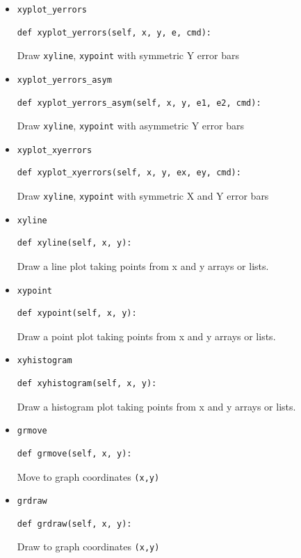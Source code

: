\documentclass[a4paper,twoside,11pt]{article}
\begin{document}
\begin{itemize}
\item{\texttt{xyplot\_yerrors}}\\
\begin{lstlisting}
def xyplot_yerrors(self, x, y, e, cmd):
\end{lstlisting}
Draw \texttt{xyline}, \texttt{xypoint} with symmetric Y error bars

\item{\texttt{xyplot\_yerrors\_asym}}\\
\begin{lstlisting}
def xyplot_yerrors_asym(self, x, y, e1, e2, cmd):
\end{lstlisting}
Draw \texttt{xyline}, \texttt{xypoint} with asymmetric Y error bars

\item{\texttt{xyplot\_xyerrors}}\\
\begin{lstlisting}
def xyplot_xyerrors(self, x, y, ex, ey, cmd):
\end{lstlisting}
Draw \texttt{xyline}, \texttt{xypoint} with symmetric X and Y error bars

\item{\texttt{xyline}}\\
\begin{lstlisting}
def xyline(self, x, y):
\end{lstlisting}
Draw a line plot taking points from x and y arrays or lists.

\item{\texttt{xypoint}}\\
\begin{lstlisting}
def xypoint(self, x, y):
\end{lstlisting}
Draw a point plot taking points from x and y arrays or lists.

\item{\texttt{xyhistogram}}\\
\begin{lstlisting}
def xyhistogram(self, x, y):
\end{lstlisting}
Draw a histogram plot taking points from x and y arrays or lists.

\item{\texttt{grmove}}\\
\begin{lstlisting}
def grmove(self, x, y):
\end{lstlisting}
Move to graph coordinates \texttt{(x,y)}

\item{\texttt{grdraw}}\\
\begin{lstlisting}
def grdraw(self, x, y):
\end{lstlisting}
Draw to graph coordinates \texttt{(x,y)}


\end{itemize}
\end{document}
